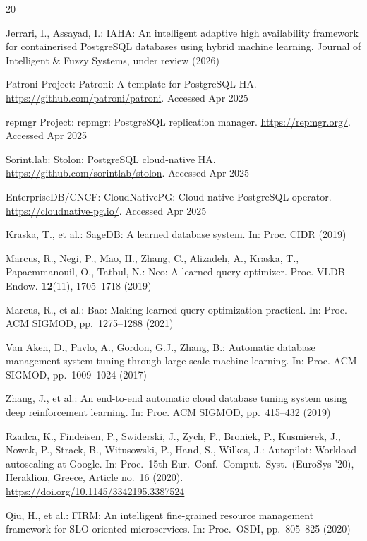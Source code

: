 \documentclass[pdflatex,sn-mathphys-num]{sn-jnl}
\theoremstyle{thmstyleone}
\theoremstyle{thmstylethree}
\begin{document}
\begin{thebibliography}{20}

Jerrari, I., Assayad, I.: IAHA: An intelligent adaptive high
availability framework for containerised PostgreSQL databases using
hybrid machine learning. Journal of Intelligent \& Fuzzy Systems,
under review (2026)

Patroni Project: Patroni: A template for PostgreSQL HA.
\url{https://github.com/patroni/patroni}. Accessed Apr 2025

repmgr Project: repmgr: PostgreSQL replication manager.
\url{https://repmgr.org/}. Accessed Apr 2025

Sorint.lab: Stolon: PostgreSQL cloud-native HA.
\url{https://github.com/sorintlab/stolon}. Accessed Apr 2025

EnterpriseDB/CNCF: CloudNativePG: Cloud-native PostgreSQL operator.
\url{https://cloudnative-pg.io/}. Accessed Apr 2025

Kraska, T., et al.: SageDB: A learned database system. In: Proc. CIDR
(2019)

Marcus, R., Negi, P., Mao, H., Zhang, C., Alizadeh, A., Kraska, T.,
Papaemmanouil, O., Tatbul, N.: Neo: A learned query optimizer. Proc.
VLDB Endow. \textbf{12}(11), 1705--1718 (2019)

Marcus, R., et al.: Bao: Making learned query optimization practical.
In: Proc. ACM SIGMOD, pp.\ 1275--1288 (2021)

Van Aken, D., Pavlo, A., Gordon, G.J., Zhang, B.: Automatic database
management system tuning through large-scale machine learning. In:
Proc. ACM SIGMOD, pp.\ 1009--1024 (2017)

Zhang, J., et al.: An end-to-end automatic cloud database tuning
system using deep reinforcement learning. In: Proc. ACM SIGMOD, pp.\
415--432 (2019)

Rzadca, K., Findeisen, P., Swiderski, J., Zych, P., Broniek, P.,
Kusmierek, J., Nowak, P., Strack, B., Witusowski, P., Hand, S.,
Wilkes, J.: Autopilot: Workload autoscaling at Google. In: Proc.\ 15th
Eur.\ Conf.\ Comput.\ Syst.\ (EuroSys '20), Heraklion, Greece, Article
no.\ 16 (2020). \url{https://doi.org/10.1145/3342195.3387524}

Qiu, H., et al.: FIRM: An intelligent fine-grained resource
management framework for SLO-oriented microservices. In: Proc.\ OSDI,
pp.\ 805--825 (2020)


\end{thebibliography}
\end{document}
